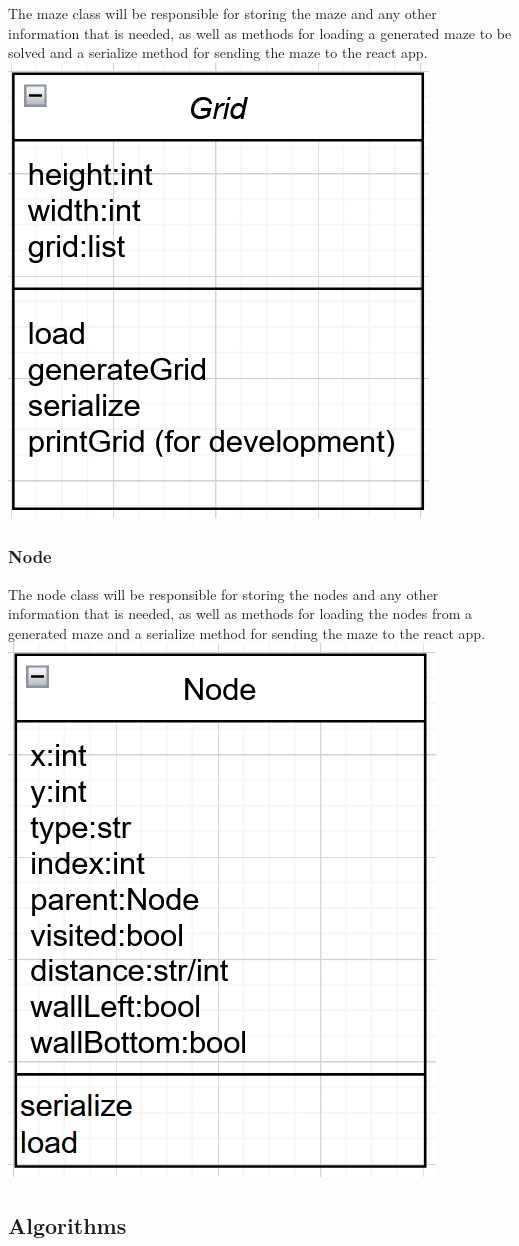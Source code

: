 \documentclass[titlepage]{article}
\begin{document}
The maze class will be responsible for storing the maze and any other information that is needed, as well as methods for loading a generated maze to be solved and a serialize method for sending the maze to the react app.
\newline
\includegraphics[width=0.5\linewidth]{assets/class diagrams/maze.PNG}

\subsubsection{Node}

The node class will be responsible for storing the nodes and any other information that is needed, as well as methods for loading the nodes from a generated maze and a serialize method for sending the maze to the react app.
\newline
\includegraphics[width=0.5\linewidth]{assets/class diagrams/node.PNG}

\subsection{Algorithms}
\end{document}
